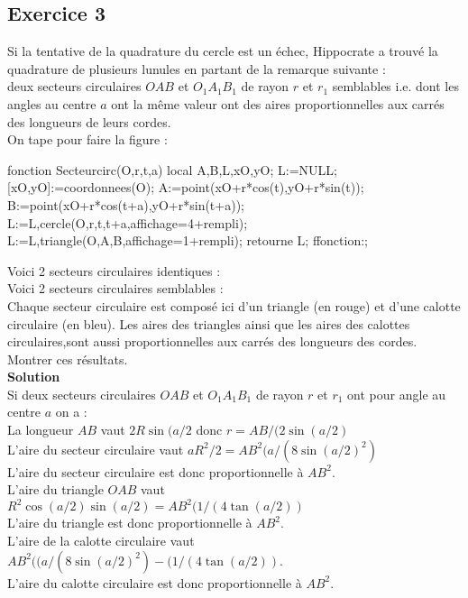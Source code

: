 \documentclass[12pt,a4paper]{book}
\begin{document}
\begin{giacjshere}
\subsection{Exercice 3}
Si la tentative de la quadrature du cercle est un \'echec, Hippocrate a trouv\'e
la quadrature de plusieurs lunules en partant de la remarque suivante :\\
deux secteurs circulaires $OAB$ et $O_1A_1B_1$ de rayon $r$ et $r_1$ semblables 
i.e. dont les angles au centre $a$ ont la m\^eme valeur ont des aires 
proportionnelles aux carr\'es des longueurs de leurs cordes.\\
On tape pour faire la figure :
\begin{giaconload}
fonction Secteurcirc(O,r,t,a)
local A,B,L,xO,yO;
L:=NULL;
[xO,yO]:=coordonnees(O);
A:=point(xO+r*cos(t),yO+r*sin(t));
B:=point(xO+r*cos(t+a),yO+r*sin(t+a));
L:=L,cercle(O,r,t,t+a,affichage=4+rempli);
L:=L,triangle(O,A,B,affichage=1+rempli);
retourne L;
ffonction:;
\end{giaconload}
Voici 2 secteurs circulaires identiques :\\
Voici 2 secteurs circulaires semblables :\\
Chaque secteur circulaire est compos\'e ici d'un triangle (en rouge) et d'une 
calotte circulaire (en bleu). Les aires des triangles ainsi que les aires des 
calottes circulaires,sont aussi proportionnelles aux carr\'es des longueurs des 
cordes.\\
Montrer ces r\'esultats.\\
{\bf Solution}\\
Si deux secteurs circulaires $OAB$ et $O_1A_1B_1$ de rayon $r$ et $r_1$ ont pour
 angle au centre $a$ on a :\\
La longueur $AB$ vaut $2R\sin(a/2$ donc $r=AB/(2\sin(a/2)$\\
L'aire du secteur circulaire vaut $aR^2/2=AB^2(a/(8\sin(a/2)^2)$\\
L'aire du secteur circulaire est donc proportionnelle \`a $AB^2$.\\
L'aire du triangle $OAB$ vaut  $R^2\cos(a/2)\sin(a/2)=AB^2(1/(4\tan(a/2))$\\
L'aire du triangle est donc proportionnelle \`a $AB^2$.\\
L'aire de la calotte circulaire vaut $AB^2((a/(8\sin(a/2)^2)-(1/(4\tan(a/2))$.\\
L'aire du calotte circulaire est donc proportionnelle \`a $AB^2$.\\

\end{giacjshere}
\end{document}
